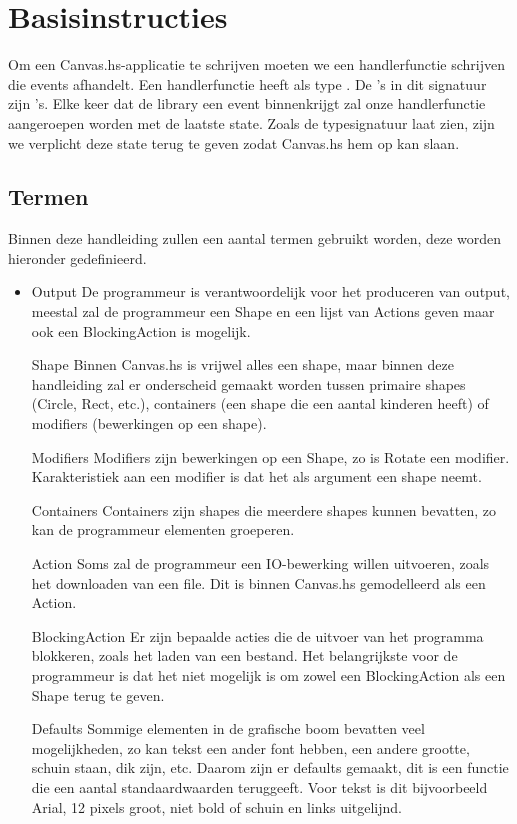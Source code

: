 \section{Basisinstructies}

Om een Canvas.hs-applicatie te schrijven moeten we een handlerfunctie schrijven die events afhandelt. Een handlerfunctie heeft als type . De 's in dit signatuur zijn 's. Elke keer dat de library een event binnenkrijgt zal onze handlerfunctie aangeroepen worden met de laatste state. Zoals de typesignatuur laat zien, zijn we verplicht deze state terug te geven zodat Canvas.hs hem op kan slaan.

\subsection{Termen}
Binnen deze handleiding zullen een aantal termen gebruikt worden, deze worden hieronder gedefinieerd.
\begin{itemize}
	\item Output
De programmeur is verantwoordelijk voor het produceren van output, meestal zal de programmeur een Shape en een lijst van Actions geven maar ook een BlockingAction is mogelijk.
	\item[Shape]
Binnen Canvas.hs is vrijwel alles een shape, maar binnen deze handleiding zal er onderscheid gemaakt worden tussen primaire shapes (Circle, Rect, etc.), containers (een shape die een aantal kinderen heeft) of modifiers (bewerkingen op een shape).
	\item[Modifiers]
Modifiers zijn bewerkingen op een Shape, zo is Rotate een modifier. Karakteristiek aan een modifier is dat het als argument een shape neemt.
	\item[Containers]
Containers zijn shapes die meerdere shapes kunnen bevatten, zo kan de programmeur elementen groeperen.
	\item[Action]
Soms zal de programmeur een IO-bewerking willen uitvoeren, zoals het downloaden van een file. Dit is binnen Canvas.hs gemodelleerd als een Action.
	\item[BlockingAction]
Er zijn bepaalde acties die de uitvoer van het programma blokkeren, zoals het laden van een bestand. Het belangrijkste voor de programmeur is dat het niet mogelijk is om zowel een BlockingAction als een Shape terug te geven. 
    \item[Defaults]
Sommige elementen in de grafische boom bevatten veel mogelijkheden, zo kan tekst een ander font hebben, een andere grootte, schuin staan, dik zijn, etc. Daarom zijn er defaults gemaakt, dit is een functie die een aantal standaardwaarden teruggeeft. Voor tekst is dit bijvoorbeeld Arial, 12 pixels groot, niet bold of schuin en links uitgelijnd.
\end{itemize}

